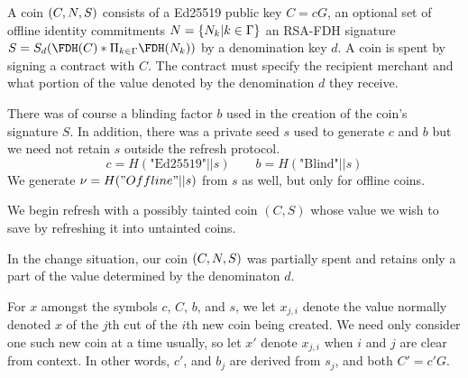 \documentclass{llncs}
\begin{document}
A coin $(C,N,S)$ consists of 
  a Ed25519 public key $C = c G$, 
  an optional set of offline identity commitments $N = \{N_k | k \in \Gamma \}$
  an RSA-FDH signature $S = S_d(\FDH(C) * \Pi_{k \in \Gamma} \FDH(\Nu_k))$ by a denomination key $d$.
A coin is spent by signing a contract with $C$.  The contract must
specify the recipient merchant and what portion of the value denoted
by the denomination $d$ they receive.

There was of course a blinding factor $b$ used in the creation of
the coin's signature $S$.  In addition, there was a private seed $s$
used to generate $c$ and $b$ but we need not retain $s$
outside the refresh protocol.
$$ c = H(\textrm{"Ed25519"} || s)
\qquad b = H(\textrm{"Blind"} || s) $$
We generate $\nu = H("Offline" || s)$ from $s$ as well,
 but only for offline coins.

\smallskip

We begin refresh with a possibly tainted coin $(C,S)$ whose value
we wish to save by refreshing it into untainted coins.  

In the change situation, our coin $(C,N,S)$ was partially spent and 
retains only a part of the value determined by the denominaton $d$.

For $x$ amongst the symbols $c$, $C$, $b$, and $s$,
we let $x_{j,i}$ denote the value normally denoted $x$ of
 the $j$th cut of the $i$th new coin being created. 
We need only consider one such new coin at a time usually, 
so let $x'$ denote $x_{j,i}$ when $i$ and $j$ are clear from context.
In other words, $c'$, and $b_j$ are derived from $s_j$,
 and both $C' = c' G$.
\end{document}
